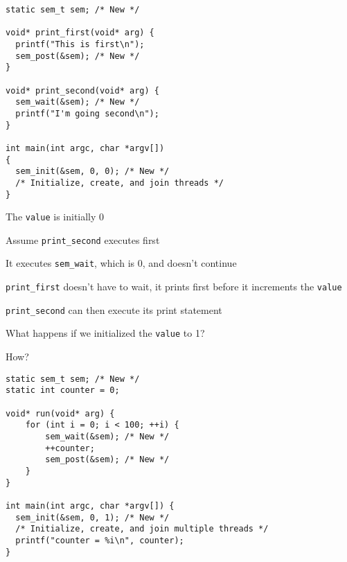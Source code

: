   \begin{slide}


    \begin{verbatim}
static sem_t sem; /* New */

void* print_first(void* arg) {
  printf("This is first\n");
  sem_post(&sem); /* New */
}

void* print_second(void* arg) {
  sem_wait(&sem); /* New */
  printf("I'm going second\n");
}

int main(int argc, char *argv[])
{
  sem_init(&sem, 0, 0); /* New */
  /* Initialize, create, and join threads */
}
    \end{verbatim}

  \end{slide}

  \begin{slide}


    The \texttt{value} is initially 0
    \medskip
  
    Assume \texttt{print\_second} executes first

    \leftspace{}It executes \texttt{sem\_wait}, which is 0, and doesn't
    continue
    \medskip

    \texttt{print\_first} doesn't have to wait, it prints first before it
    increments the \texttt{value}
    \medskip

    \texttt{print\_second} can then execute its print statement
    \medskip

    What happens if we initialized the \texttt{value} to 1?

  \end{slide}

  \begin{slide}


    How?

  \end{slide}

  \begin{slide}


    \begin{verbatim}
static sem_t sem; /* New */
static int counter = 0;

void* run(void* arg) {
    for (int i = 0; i < 100; ++i) {
        sem_wait(&sem); /* New */
        ++counter;
        sem_post(&sem); /* New */
    }
}

int main(int argc, char *argv[]) {
  sem_init(&sem, 0, 1); /* New */
  /* Initialize, create, and join multiple threads */
  printf("counter = %i\n", counter);
}
    \end{verbatim}

  \end{slide}

